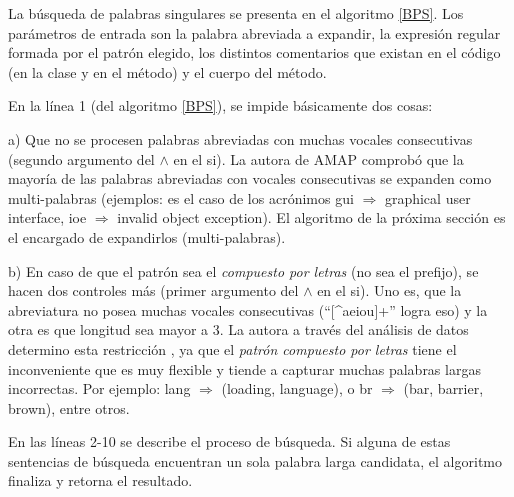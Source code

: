 La búsqueda de palabras singulares se presenta en el algoritmo \ref{BPS}. Los parámetros de entrada son la palabra abreviada a expandir, la expresión regular formada por el patrón elegido, los distintos comentarios que existan en el código (en la clase y en el método) y el cuerpo del método.

En la línea 1 (del algoritmo \ref{BPS}), se impide básicamente dos cosas: 

a) Que no se procesen palabras abreviadas con muchas vocales consecutivas (segundo argumento del $\land$ en el \textsf{si}). La autora de AMAP comprobó \cite{EZH08} que la mayoría de las palabras abreviadas con vocales consecutivas se expanden como multi-palabras (ejemplos: es el caso de los acrónimos \textsf{gui} $\Rightarrow$ \textsf{graphical user interface}, \textsf{ioe} $\Rightarrow$ \textsf{invalid object exception}). El algoritmo de la próxima sección es el encargado de expandirlos (multi-palabras).

b) En caso de que el patrón sea el \textit{compuesto por letras} (no sea el prefijo), se hacen dos controles más (primer argumento del $\land$ en el \textsf{si}). Uno es, que la abreviatura no posea muchas vocales consecutivas (“[\^{}aeiou]+” logra eso) y la otra es que longitud sea mayor a 3. La autora a través del análisis de datos determino esta restricción \cite{EZH08}, ya que el \textit{patrón compuesto por letras} tiene el inconveniente que es muy flexible y tiende a capturar muchas palabras largas incorrectas. Por ejemplo: \textsf{lang} $\Rightarrow$ (\textsf{loading}, \textsf{language}), o \textsf{br} $\Rightarrow$ (\textsf{bar}, \textsf{barrier}, \textsf{brown}), entre otros.

En las líneas 2-10 se describe el proceso de búsqueda. Si alguna de estas sentencias de búsqueda encuentran un sola palabra larga candidata, el algoritmo finaliza y retorna el resultado. 

